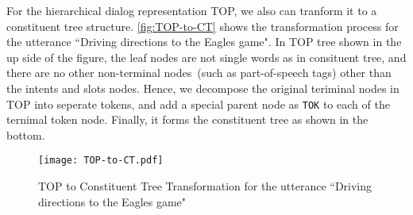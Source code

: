  For the hierarchical dialog
representation TOP, we also can tranform it to a constituent tree
structure. \autoref{fig:TOP-to-CT} shows the transformation process
for the utterance ``Driving directions to the Eagles game". In TOP
tree shown in the up side of the figure, the leaf nodes are not single
words as in consituent tree, and there are no other non-terminal
nodes~(such as part-of-speech tags) other than the intents and slots
nodes. Hence, we decompose the original teriminal nodes in TOP into
seperate tokens, and add a special parent node as \texttt{TOK} to each
of the ternimal token node. Finally, it forms the constituent tree as
shown in the bottom.
\begin{figure}[!h]
\centering
\texttt{[image: TOP-to-CT.pdf]}
\caption{\label{fig:TOP-to-CT} TOP to Constituent Tree Transformation
  for the utterance ``Driving directions to the Eagles game"}
\end{figure}

